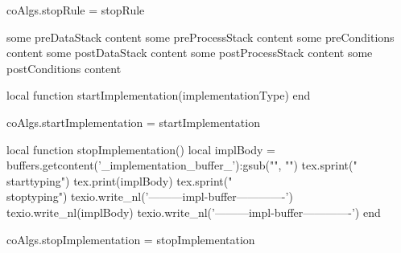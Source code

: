coAlgs.stopRule = stopRule
\stopLuaCode

\startConTest
  \startRule[testRule]
    \preDataStack
      some preDataStack content
    \preProcessStack
      some preProcessStack content
    \preConditions
      some preConditions content
    \postDataStack
      some postDataStack content
    \postProcessStack
      some postProcessStack content
    \postConditions  
      some postConditions content
  \stopRule
\stopConTest
\stopTestCase
\stopTestSuite


\startMkIVCode
\let\stopImplementation\relax

\def\stopImplementationDone{
  \directlua{thirddata.joyLoLCoAlgs.stopImplementation()}
}

\def\startImplementation[#1]{
  \directlua{thirddata.joyLoLCoAlgs.startImplementation('#1')}
  \buff_pickup{_implementation_buffer_}%
    {startImplementation}{stopImplementation}%
    {\relax}{\stopImplementationDone}\plusone%
}
\stopMkIVCode

\startLuaCode
local function startImplementation(implementationType)
end

coAlgs.startImplementation = startImplementation

local function stopImplementation()
  local implBody  = buffers.getcontent('_implementation_buffer_'):gsub("", "\n")
  tex.sprint("\\starttyping")
  tex.print(implBody)
  tex.sprint("\\stoptyping")
  texio.write_nl('---------impl-buffer-------------')
  texio.write_nl(implBody)
  texio.write_nl('---------impl-buffer-------------')
end

coAlgs.stopImplementation = stopImplementation
\stopLuaCode

\stopTestSuite